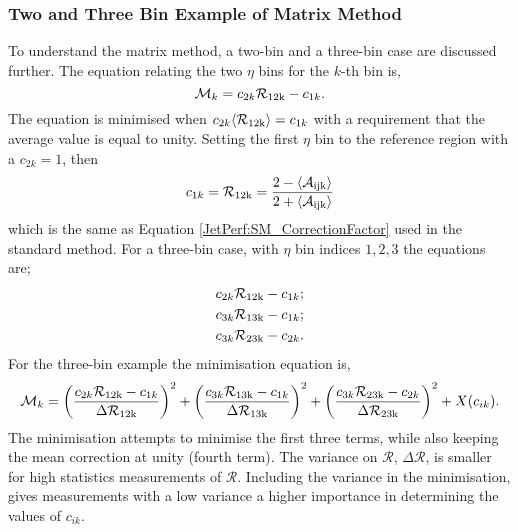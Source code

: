 \subsubsection{Two and Three Bin Example of Matrix Method}
To understand the matrix method, a two-bin and a three-bin case are discussed further.
The equation relating the two $\eta$ bins for the $k$-th \ptave{} bin is,  
\begin{equation}
\mathcal{M}_{k} = c_{2k}\mathcal{R_{\rm 12k}}- c_{1k}.
\label{JetPerf:Matrix_2binEquations}
\end{equation}
The equation is minimised when $c_{2k}\mbox{$\langle \mathcal{R_{\rm 12k}} \rangle$}= c_{1k}$ with a requirement that the average value is equal to unity.
Setting the first $\eta$ bin to the reference region with a $c_{2k}=1$, then 
\begin{equation}
c_{1k}=\mathcal{R_{\rm 12k}}= \frac{2-\mbox{$\langle \mathcal{A_{\rm ijk}} \rangle$}}{2+\mbox{$\langle \mathcal{A_{\rm ijk}} \rangle$}} 
\label{JetPerf:Matrix_2binEquations}
\end{equation}
which is the same as Equation \ref{JetPerf:SM_CorrectionFactor} used in the standard method.
For a three-bin case, with $\eta$ bin indices ${1,2,3}$ the equations are;
\begin{equation}
\begin{split}
c_{2k}\mathcal{R_{\rm 12k}}- c_{1k}; \\
c_{3k}\mathcal{R_{\rm 13k}}- c_{1k}; \\
c_{3k}\mathcal{R_{\rm 23k}}- c_{2k}.
\end{split}
\label{JetPerf:Matrix_3binEquations}
\end{equation}
For the three-bin example the minimisation equation is,
\begin{equation}
\mathcal{M}_{k} =\left(\frac{c_{2k}\mathcal{R_{\rm 12k}}- c_{1k}}{\Delta\mathcal{R_{\rm 12k}}}\right)^2+
\left(\frac{c_{3k}\mathcal{R_{\rm 13k}}- c_{1k}}{\Delta\mathcal{R_{\rm 13k}}}\right)^2+
\left(\frac{c_{3k}\mathcal{R_{\rm 23k}}- c_{2k}}{\Delta\mathcal{R_{\rm 23k}}}\right)^2+ X(c_{ik}).
\label{JetPerf:Matrix_3binEquations2}
\end{equation}
The minimisation attempts to minimise the first three terms, while also keeping the mean correction at unity (fourth term).
The variance on $\mathcal{R}$, $\Delta\mathcal{R}$, is smaller for high statistics measurements of $\mathcal{R}$.
Including the variance in the minimisation, gives measurements with a low variance a higher importance in determining the values of $c_{ik}$. 


